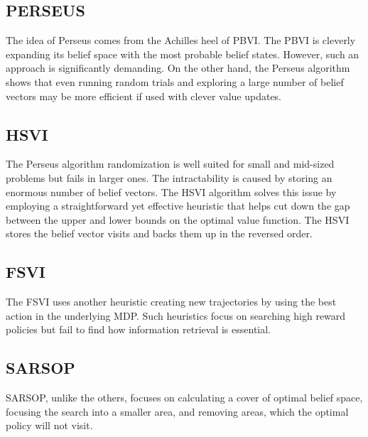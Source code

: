\subsection{PERSEUS \cite{perseus}}

The idea of Perseus comes from the Achilles heel of PBVI. The PBVI is cleverly expanding its belief space with the most probable belief states. However, such an approach is significantly demanding. On the other hand, the Perseus algorithm shows that even running random trials and exploring a large number of belief vectors may be more efficient if used with clever value updates.


\subsection{HSVI \cite{hsvi}}
The Perseus algorithm randomization is well suited for small and mid-sized problems but fails in larger ones. The intractability is caused by storing an enormous number of belief vectors. The HSVI algorithm solves this issue by employing a straightforward yet effective heuristic that helps cut down the gap between the upper and lower bounds on the optimal value function. The HSVI stores the belief vector visits and backs them up in the reversed order.


\subsection{FSVI \cite{fsvi}}
The FSVI uses another heuristic creating new trajectories by using the best action in the underlying MDP. Such heuristics focus on searching high reward policies but fail to find how information retrieval is essential.


\subsection{SARSOP \cite{sarsop}}
SARSOP, unlike the others, focuses on calculating a cover of optimal belief space, focusing the search into a smaller area, and removing areas, which the optimal policy will not visit.


